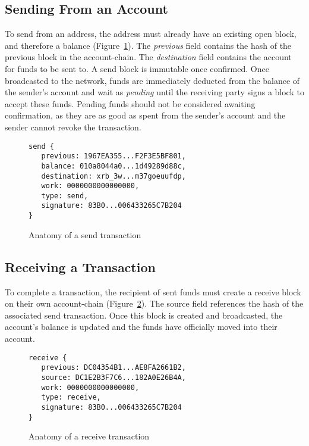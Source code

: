 \subsection{Sending From an Account} \label{sec:send}
To send from an address, the address must already have an existing open block, and therefore a balance (Figure~\ref{code:send}). The \textit{previous} field contains the hash of the previous block in the account-chain. The \textit{destination} field contains the account for funds to be sent to. A send block is immutable once confirmed. Once broadcasted to the network, funds are immediately deducted from the balance of the sender’s account and wait as \textit{pending} until the receiving party signs a block to accept these funds. Pending funds should not be considered awaiting confirmation, as they are as good as spent from the sender’s account and the sender cannot revoke the transaction.

\begin{figure}[!ht]
\begin{lstlisting}
send {
   previous: 1967EA355...F2F3E5BF801,
   balance: 010a8044a0...1d49289d88c,
   destination: xrb_3w...m37goeuufdp,
   work: 0000000000000000,
   type: send,
   signature: 83B0...006433265C7B204
}
\end{lstlisting}
\caption{Anatomy of a send transaction}
\label{code:send}
\end{figure}

\subsection{Receiving a Transaction}\label{sec:receive}
To complete a transaction, the recipient of sent funds must create a receive block on their own account-chain (Figure~\ref{code:receive}). The source field references the hash of the associated send transaction. Once this block is created and broadcasted, the account’s balance is updated and the funds have officially moved into their account.

\begin{figure}[!ht]
\begin{lstlisting}
receive {
   previous: DC04354B1...AE8FA2661B2,
   source: DC1E2B3F7C6...182A0E26B4A,
   work: 0000000000000000,
   type: receive,
   signature: 83B0...006433265C7B204
}
\end{lstlisting}
\caption{Anatomy of a receive transaction}
\label{code:receive}
\end{figure}

